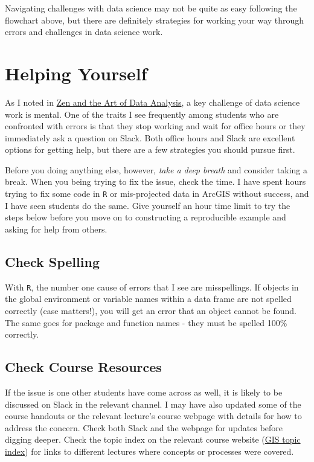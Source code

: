 \documentclass[]{book}
\theoremstyle{definition}
\theoremstyle{definition}
\theoremstyle{definition}
\theoremstyle{remark}
\begin{document}
Navigating challenges with data science may not be quite as easy
following the flowchart above, but there are definitely strategies for
working your way through errors and challenges in data science work.

\hypertarget{helping-yourself}{\section{Helping
Yourself}\label{helping-yourself}}

As I noted in \protect\hyperlink{zen-and-the-art-of-data-analysis}{Zen
and the Art of Data Analysis}, a key challenge of data science work is
mental. One of the traits I see frequently among students who are
confronted with errors is that they stop working and wait for office
hours or they immediately ask a question on Slack. Both office hours and
Slack are excellent options for getting help, but there are a few
strategies you should pursue first.

Before you doing anything else, however, \emph{take a deep breath} and
consider taking a break. When you being trying to fix the issue, check
the time. I have spent hours trying to fix some code in \texttt{R} or
mis-projected data in ArcGIS without success, and I have seen students
do the same. Give yourself an hour time limit to try the steps below
before you move on to constructing a reproducible example and asking for
help from others.

\subsection{Check Spelling}\label{check-spelling}

With \texttt{R}, the number one cause of errors that I see are
misspellings. If objects in the global environment or variable names
within a data frame are not spelled correctly (case matters!), you will
get an error that an object cannot be found. The same goes for package
and function names - they must be spelled 100\% correctly.

\subsection{Check Course Resources}\label{check-course-resources}

If the issue is one other students have come across as well, it is
likely to be discussed on Slack in the relevant channel. I may have also
updated some of the course handouts or the relevant lecture's course
webpage with details for how to address the concern. Check both Slack
and the webpage for updates before digging deeper. Check the topic index
on the relevant course website
(\href{https://slu-soc5650.github.io/topic-index/}{GIS topic index}) for
links to different lectures where concepts or processes were covered.
\end{document}
